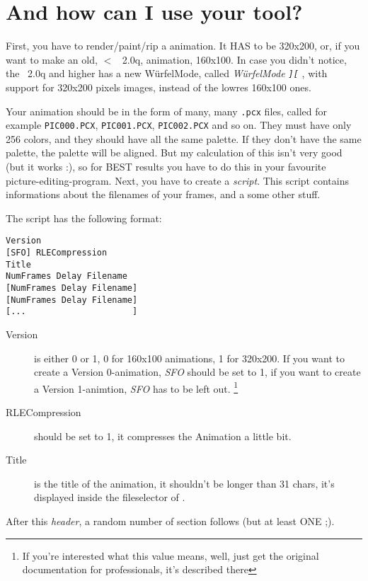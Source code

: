 \section{And how can I use your tool?}
First, you have to render/paint/rip a animation. It HAS to be 320x200, or,
if you want to make an old, $<$ \cp\ 2.0q, animation, 160x100.
In case you didn't notice, the \cp\ 2.0q and higher has a new W\"urfelMode,
called \emph{W\"urfelMode \texttt{][}} , with support for 320x200 pixels
images, instead of the lowres 160x100 ones.

Your  animation should be in the form of many, many \texttt{.pcx} files,
called for example \texttt{PIC000.PCX}, \texttt{PIC001.PCX},
\texttt{PIC002.PCX} and so on. They  must have only 256 colors, and they
should have all the same palette. If  they don't have the same palette, the
palette will be aligned. But my calculation of this isn't very good (but it
works :), so for BEST results you have to do this in your favourite
picture-editing-program. Next,  you have  to create  a \emph{script}. This
script contains informations about the filenames of your frames, and a some
other stuff.
 
The script has the following format: 
\begin{verbatim} 
Version 
[SFO] RLECompression 
Title 
NumFrames Delay Filename 
[NumFrames Delay Filename] 
[NumFrames Delay Filename] 
[...                     ] 
\end{verbatim} 

\begin{description}
\item[Version] is either 0 or 1, 0 for 160x100 animations, 1 for 320x200.
If you want to create a Version 0-animation, \emph{SFO} should be set to 1,
if you want to create a Version 1-animtion, \emph{SFO} has to be left out.
\footnote{If  you're interested what  this value means, well, just get the
original documentation for professionals, it's described there}
\item[RLECompression] should be set to 1, it compresses the Animation a little
bit.
\item[Title] is the title of the animation, it shouldn't be longer than 31
chars, it's displayed inside the fileselector of \cp.
\end{description}

After this \emph{header}, a random number of section follows (but at least 
ONE ;). 

